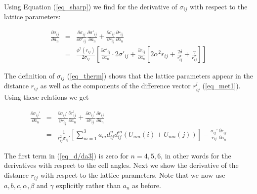 \noindent
Using Equation (\ref{eq_sharp}) we find for the derivative of $\sigma_{ij}$
with respect to the lattice parameters:

\begin{eqnarray}
    \frac{\partial \sigma_{ij}} {\partial a_{n}} & = &
    \frac{\partial \sigma_{ij}} {\partial \sigma'_{ij}}
    \frac{\partial \sigma'_{ij}}{\partial a_{n}} +
    \frac{\partial \sigma_{ij}} {\partial r_{ij}}
    \frac{\partial r_{ij}}      {\partial a_{n}}  \nonumber  \\
    & = &
    \frac{\phi^{2}(r_{ij})}{2 \sigma_{ij}} \left [
    \frac{\partial \sigma'_{ij}}{\partial a_{n}} \cdot 2 \sigma'_{ij}
    +
    \frac{\partial r_{ij}}{\partial a_{n}} \left [
    2 \alpha^{2} r_{ij} + \frac{2 \delta}{r^{3}_{ij}} +
    \frac{\gamma}{r^{2}_{ij}} \right ] \right ]
  \label{eq_d/da2}
\end{eqnarray}

\noindent
The definition of $\sigma_{ij}$ (\ref{eq_therm}) shows that the lattice
parameters appear in the distance $r_{ij}$ as well as the components
of the difference vector $r_{ij}^{l}$ (\ref{eq_met1}). Using these
relations we get

\begin{eqnarray}
  \frac{\partial \sigma_{ij}'} {\partial a_{n}} & = &
    \frac{\partial \sigma_{ij}'} {\partial r^{l}_{ij}}
    \frac{\partial r^{l}_{ij}}   {\partial a_{n}} +
    \frac{\partial \sigma_{ij}'} {\partial r_{ij}}
    \frac{\partial r_{ij}} {\partial a_{n}} \nonumber \\
  & = & \frac{1}{r_{ij}^{2} \sigma_{ij}'} \left [
    \sum_{m=1}^{3} a_{m}d_{ij}^{n}d_{ij}^{m} \left (
    U_{nm}(i) + U_{nm}(j) \right ) \right ] -
    \frac{\sigma_{ij}'}{r_{ij}}
    \frac{\partial r_{ij}} {\partial a_{n}}
  \label{eq_d/da3}
\end{eqnarray}

\noindent
The first term in (\ref{eq_d/da3}) is zero for $n=4,5,6$, in other
words for the derivatives with respect to the cell angles. Next we
show the derivative of the distance $r_{ij}$ with respect to the
lattice parameters. Note that we now use $a,b,c,\alpha,\beta$ and
$\gamma$ explicitly rather than $a_{n}$ as before.

